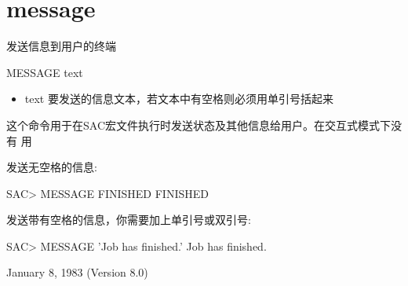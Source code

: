\section{message}
\label{cmd:message}

发送信息到用户的终端

MESSAGE text

\begin{itemize}
\item text 要发送的信息文本，若文本中有空格则必须用单引号括起来
\end{itemize}

这个命令用于在SAC宏文件执行时发送状态及其他信息给用户。在交互式模式下没有	用

发送无空格的信息:
\begin{SACCode}
SAC> MESSAGE FINISHED
 FINISHED
\end{SACCode}

发送带有空格的信息，你需要加上单引号或双引号:
\begin{SACCode}
SAC> MESSAGE 'Job has finished.'
 Job has finished.
\end{SACCode}

January 8, 1983 (Version 8.0)
